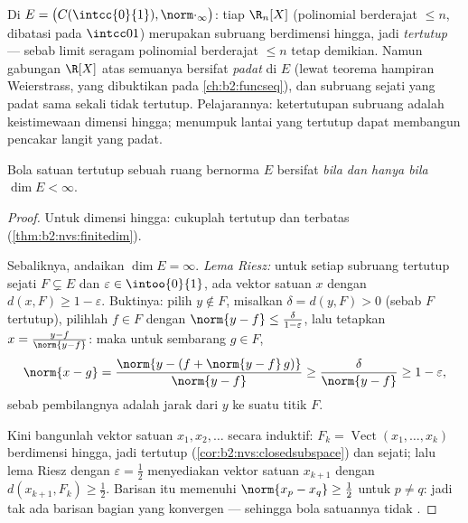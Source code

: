 \begin{example}\label{ex:b2:nvs:closeddense}
Di $E = \bigl(C(\intcc{0}{1}), \norm\cdot_\infty\bigr)$: tiap
$\R_n[X]$ (polinomial berderajat $\leq n$, dibatasi pada
$\intcc01$) merupakan subruang berdimensi hingga, jadi \emph{tertutup}
--- sebab limit seragam polinomial berderajat $\leq n$ tetap demikian.
Namun gabungan $\R[X]$ atas semuanya bersifat \emph{padat} di $E$
(lewat teorema hampiran Weierstrass, yang dibuktikan pada
\cref{ch:b2:funcseq}), dan subruang sejati yang padat sama sekali tidak
tertutup. Pelajarannya: ketertutupan subruang adalah keistimewaan
dimensi hingga; menumpuk lantai yang tertutup dapat membangun
pencakar langit yang padat.
\end{example}

\begin{theorem}[Riesz]\label{thm:b2:nvs:riesz}
Bola satuan tertutup sebuah ruang bernorma $E$ bersifat 
\emph{bila dan hanya bila} $\dim E < \infty$.
\end{theorem}

\begin{proof}
Untuk dimensi hingga: cukuplah tertutup dan terbatas
(\cref{thm:b2:nvs:finitedim}).

Sebaliknya, andaikan $\dim E = \infty$. \emph{Lema Riesz:} untuk
setiap subruang tertutup sejati $F \subsetneq E$ dan $\varepsilon \in
\intoo{0}{1}$, ada vektor satuan $x$ dengan $d(x, F) \geq 1 -
\varepsilon$. Buktinya: pilih $y \notin F$, misalkan $\delta = d(y, F) > 0$
(sebab $F$ tertutup), pilihlah $f \in F$ dengan $\norm{y - f} \leq
\frac{\delta}{1 - \varepsilon}$, lalu tetapkan $x = \frac{y - f}{\norm{y -
f}}$: maka untuk sembarang $g \in F$,
\[
\norm{x - g} = \frac{\norm{y - (f + \norm{y-f}\,g)}}{\norm{y - f}}
\geq \frac{\delta}{\norm{y-f}} \geq 1 - \varepsilon ,
\]
sebab pembilangnya adalah jarak dari $y$ ke suatu titik $F$.

Kini bangunlah vektor satuan $x_1, x_2, \dots$ secara induktif: $F_k =
\operatorname{Vect}(x_1, \dots, x_k)$ berdimensi hingga, jadi
tertutup (\cref{cor:b2:nvs:closedsubspace}) dan sejati; lalu lema Riesz
dengan $\varepsilon = \frac12$ menyediakan vektor satuan $x_{k+1}$ dengan
$d(x_{k+1}, F_k) \geq \frac12$. Barisan itu memenuhi $\norm{x_p - x_q}
\geq \frac12$ untuk $p \neq q$: jadi tak ada barisan bagian yang
konvergen --- sehingga bola satuannya tidak .
\end{proof}


